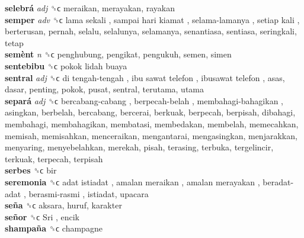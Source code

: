 \textbf{selebrá} \emph{adj}  ␝ϲ  meraikan, merayakan, rayakan  \\
\textbf{semper} \emph{adv}  ␝ϲ   lama sekali ,  sampai hari kiamat ,  selama-lamanya ,  setiap kali , berterusan, pernah, selalu, selalunya, selamanya, senantiasa, sentiasa, seringkali, tetap  \\
\textbf{semènt} \emph{n}  ␝ϲ  penghubung, pengikat, pengukuh, semen, simen  \\
\textbf{sentebibu} ␝ϲ   pokok lidah buaya   \\
\textbf{sentral} \emph{adj}  ␝ϲ   di tengah-tengah ,  ibu sawat telefon ,  ibusawat telefon , asas, dasar, penting, pokok, pusat, sentral, terutama, utama  \\
\textbf{separá} \emph{adj}  ␝ϲ   bercabang-cabang ,  berpecah-belah ,  membahagi-bahagikan , asingkan, berbelah, bercabang, bercerai, berkuak, berpecah, berpisah, dibahagi, membahagi, membahagikan, membatasi, membedakan, membelah, memecahkan, memisah, memisahkan, menceraikan, mengantarai, mengasingkan, menjarakkan, menyaring, menyebelahkan, merekah, pisah, terasing, terbuka, tergelincir, terkuak, terpecah, terpisah  \\
\textbf{serbes} ␝ϲ  bir  \\
\textbf{seremonia} ␝ϲ   adat istiadat ,  amalan meraikan ,  amalan merayakan ,  beradat-adat ,  berasmi-rasmi , istiadat, upacara  \\
\textbf{seña} ␝ϲ  aksara, huruf, karakter  \\
\textbf{señor} ␝ϲ   Sri , encik  \\
\textbf{shampaña} ␝ϲ  champagne  \\
